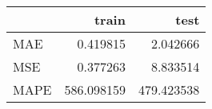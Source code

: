 \begin{tabular}{lrr}
\toprule
{} &       train &        test \\
\midrule
MAE  &    0.419815 &    2.042666 \\
MSE  &    0.377263 &    8.833514 \\
MAPE &  586.098159 &  479.423538 \\
\bottomrule
\end{tabular}
